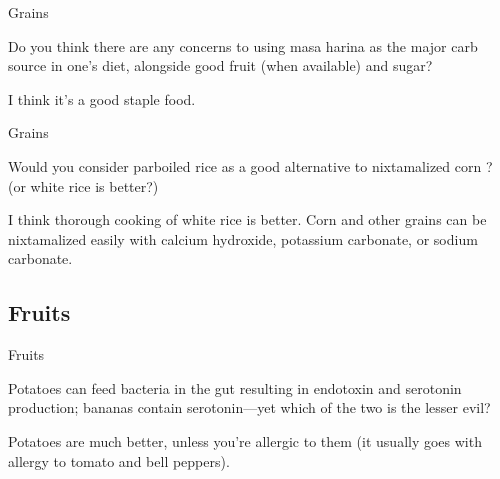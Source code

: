 \documentclass[11pt,oneside,openany,extrafontsizes]{memoir}
\begin{document}
\begin{qaexchange}{Grains}

    \begin{question}
        Do you think there are any concerns to using masa harina as the major carb source in one's diet, alongside good fruit (when available) and sugar?
    \end{question}

    \begin{answer}
       I think it's a good staple food.
    \end{answer}
\end{qaexchange}

\begin{qaexchange}{Grains}

    \begin{question}
        Would you consider parboiled rice as a good alternative to nixtamalized corn ? (or white rice is better?)
    \end{question}

    \begin{answer}
       I think thorough cooking of white rice is better. Corn and other grains can be nixtamalized easily with calcium hydroxide, potassium carbonate, or sodium carbonate.
    \end{answer}
\end{qaexchange}

\subsection{Fruits}

\begin{qaexchange}{Fruits}

    \begin{question}
        Potatoes can feed bacteria in the gut resulting in endotoxin and serotonin production; bananas contain serotonin---yet which of the two is the lesser evil?
    \end{question}

    \begin{answer}
        Potatoes are much better, unless you're allergic to them (it usually goes with allergy to tomato and bell peppers).
    \end{answer}
\end{qaexchange}
\end{document}
